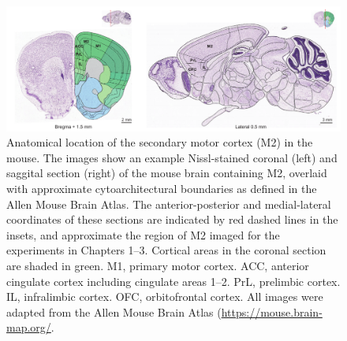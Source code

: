 \begin{figure}[htbp]

\begin{center}
\includegraphics[width=\textwidth]{Figures/Introduction/Intro_fig_M2} 
\end{center}

\caption[Anatomical location of the secondary motor cortex]
{Anatomical location of the secondary motor cortex (M2) in the mouse. The images show an example Nissl-stained coronal (left) and saggital section (right) of the mouse brain containing M2, overlaid with approximate cytoarchitectural boundaries as defined in the Allen Mouse Brain Atlas. The anterior-posterior and medial-lateral coordinates of these sections are indicated by red dashed lines in the insets, and approximate the region of M2 imaged for the experiments in Chapters 1--3. Cortical areas in the coronal section are shaded in green. M1, primary motor cortex. ACC, anterior cingulate cortex including cingulate areas 1--2. PrL, prelimbic cortex. IL, infralimbic cortex. OFC, orbitofrontal cortex. All images were adapted from the Allen Mouse Brain Atlas (\url{https://mouse.brain-map.org/}.}

\label{fig:CC_fig1}
\end{figure}
